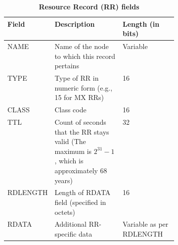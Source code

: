 \begin{table}[H]
    \centering
    \caption{\textbf{Resource Record (RR) fields}}
    \begin{tabularx}{\linewidth}{|X|p{0.4\linewidth}|X|}
    \hline
    \textbf{Field} & \textbf{Description} & \textbf{Length (in bits)}\\ \hline
    NAME & Name of the node to which this record pertains & Variable   \\ \hline
    TYPE & Type of RR in numeric form (e.g., 15 for MX RRs) & 16\\ \hline
    CLASS & Class code & 16\\ \hline
    TTL & Count of seconds that the RR stays valid (The maximum is $2^{31}-1$, which is approximately 68 years) & 32\\ \hline
    RDLENGTH & Length of RDATA field (specified in octets) & 16\\ \hline
    RDATA & Additional RR-specific data & Variable as per RDLENGTH\\ \hline
    \end{tabularx}
    \label{tab:resource}
\end{table}

